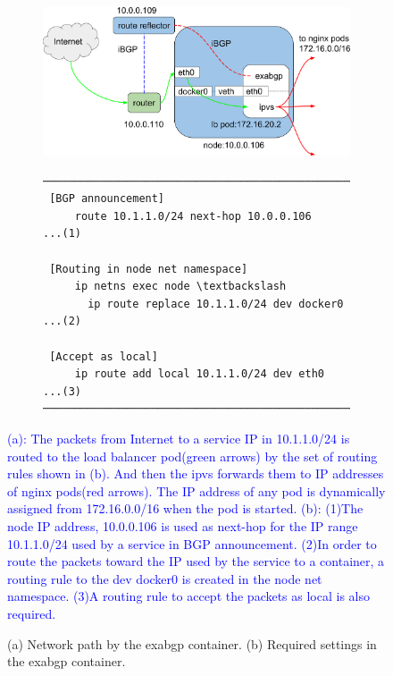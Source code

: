 \begin{figure}[tb]

  \begin{subfigure}[t]{\columnwidth}
    \includegraphics[width=0.9\columnwidth]{Figs/exabgp}
    \caption{}
    \label{fig:exabgp_schem}
  \end{subfigure}

  \par\bigskip

  \begin{subfigure}[t]{\columnwidth}

\begin{Verbatim}[commandchars=\\\{\}]
───────────────────────────────────────────────────────
 [BGP announcement]
     route 10.1.1.0/24 next-hop 10.0.0.106       ...(1)

 [Routing in node net namespace]
     ip netns exec node \textbackslash
       ip route replace 10.1.1.0/24 dev docker0  ...(2)
      
 [Accept as local]
     ip route add local 10.1.1.0/24 dev eth0     ...(3)
───────────────────────────────────────────────────────
\end{Verbatim}
    \caption{}
    \label{fig:exabgp_setting}
  \end{subfigure}

  \caption{
    (a) Network path by the exabgp container.
    (b) Required settings in the exabgp container.
  }
\textcolor{blue}{
  (a): The packets from Internet to a service IP in 10.1.1.0/24 is routed to the load balancer pod(green arrows) by the set of routing rules shown in (b).
  And then the ipvs forwards them to IP addresses of nginx pods(red arrows).
  The IP address of any pod is dynamically assigned from 172.16.0.0/16 when the pod is started. 
  (b): (1)The node IP address, 10.0.0.106 is used as next-hop for the IP range 10.1.1.0/24 used by a service in BGP announcement.
  (2)In order to route the packets toward the IP used by the service to a container, a routing rule to the dev docker0 is created in the node net namespace.
  (3)A routing rule to accept the packets as local is also required. 
}
\label{fig:exabgp}
\end{figure}

